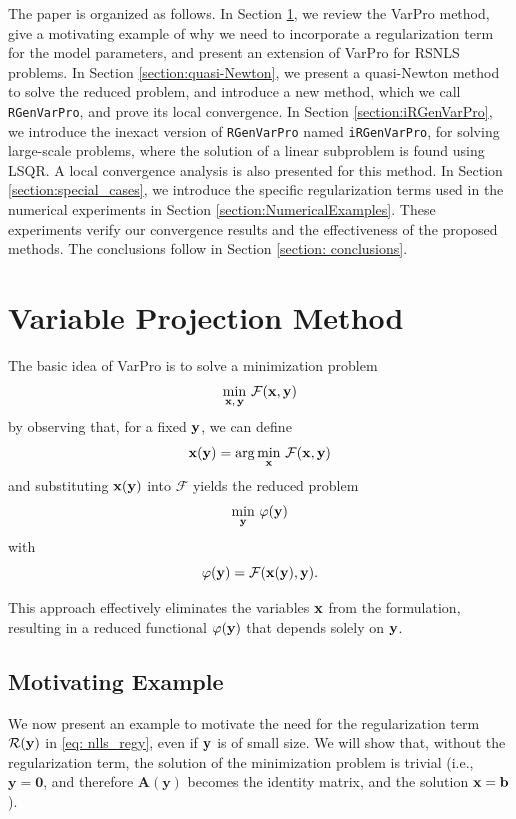 \documentclass[onefignum,onetabnum]{siamart171218}
\newcommand{\bb}{{\bf b}}
\newcommand{\bx}{{\bf x}}
\newcommand{\by}{{\bf y}}
\newcommand{\calF}{\mathcal{F}}
\begin{document}
The paper is organized as follows. In Section \ref{sec:varpro}, we review the VarPro method, give a motivating example of why we need to incorporate a regularization term for the model parameters, and present an extension of VarPro for RSNLS problems. In Section \ref{section:quasi-Newton}, we present a quasi-Newton method to solve the reduced problem, and introduce a new method, which we call \texttt{RGenVarPro}, and prove its local convergence. In Section \ref{section:iRGenVarPro}, we introduce the inexact version of \texttt{RGenVarPro} named \texttt{iRGenVarPro}, for solving large-scale problems, where the solution of a linear subproblem is found using LSQR. A local convergence analysis is also presented for this method. In Section \ref{section:special_cases}, we introduce the specific regularization terms used in the numerical experiments in Section \ref{section:NumericalExamples}. These experiments verify our convergence results and the effectiveness of the proposed methods. The conclusions follow in Section \ref{section: conclusions}.

\section{Variable Projection Method}\label{sec:varpro}
The basic idea of VarPro is to solve a minimization problem  
$$\min_{\bx,\,\by}\,\calF(\bx,\by)$$
by observing that, for a fixed \(\by\), we can define
$$\bx(\by) = \arg\min_{\bx}\,\calF(\bx, \by)$$
and substituting $\bx(\by)$ into $\calF$ yields the reduced problem  
\begin{equation}\label{eq: minvarphi}
\min_{\by}\,\varphi(\by)
\end{equation}
 with $$\varphi(\by) = \calF(\bx(\by), \by).$$
 
This approach effectively eliminates the variables $\bx$ from the formulation, resulting in a reduced functional $\varphi(\by)$ that depends solely on $\by$.

\subsection{Motivating Example}\label{sec: motivating example}
We now present an example to motivate the need for the regularization term $\mathcal{R}(\by)$ in \eqref{eq: nlls_regy}, even if $\by$ is of small size. We will show that, without the regularization term, the solution of the minimization problem is trivial (i.e., $\mathbf{y}=\boldsymbol{0}$, and therefore $\mathbf{A}(\mathbf{y})$ becomes the identity matrix, and the solution $\bx=\bb$). 
\end{document}
